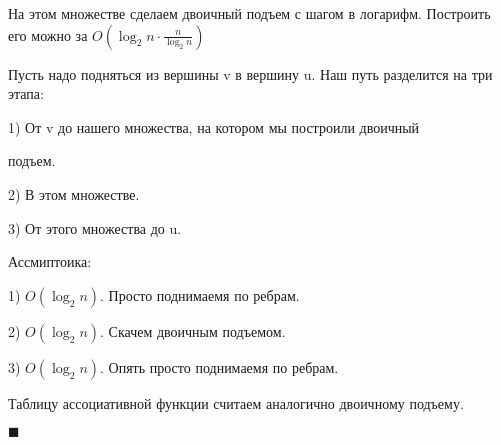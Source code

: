 \documentclass{article}
\begin{document}
  На этом множестве сделаем двоичный подъем с шагом в логарифм. Построить его можно за
   $ O(\log_2 n \cdot \frac{n}{\log_2 n}) $

  Пусть надо подняться из вершины v в вершину u. Наш путь разделится на три этапа:

  1) От v до нашего множества, на котором мы построили двоичный

  подъем.

  2) В этом множестве.

  3) От этого множества до u.

  Ассмиптоика:

  1) $O(\log_2 n)$. Просто поднимаемя по ребрам.

  2) $O(\log_2 n)$. Скачем двоичным подъемом.

  3) $O(\log_2 n)$. Опять просто поднимаемя по ребрам.

  Таблицу ассоциативной функции считаем аналогично двоичному подъему.

  \begin{flushright}
    $\blacksquare$
  \end{flushright}


 
\end{document}
